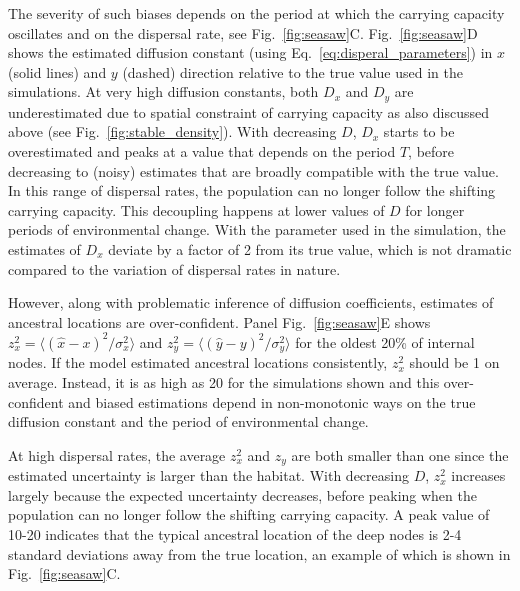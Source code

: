 \documentclass[aps,rmp, twocolumn]{revtex4}
\begin{document}
The severity of such biases depends on the period at which the carrying capacity oscillates and on the dispersal rate, see  Fig.~\ref{fig:seasaw}C.
Fig.~\ref{fig:seasaw}D shows the estimated diffusion constant (using Eq.~\ref{eq:disperal_parameters}) in $x$ (solid lines) and $y$ (dashed) direction relative to the true value used in the simulations.
At very high diffusion constants, both $D_x$ and $D_y$ are underestimated due to spatial constraint of carrying capacity as also discussed above (see Fig.~\ref{fig:stable_density}).
With decreasing $D$, $D_x$ starts to be overestimated and peaks at a value that depends on the period $T$, before decreasing to (noisy) estimates that are broadly compatible with the true value.
In this range of dispersal rates, the population can no longer follow the shifting carrying capacity.
This decoupling happens at lower values of $D$ for longer periods of environmental change.
With the parameter used in the simulation, the estimates of $D_x$ deviate by a factor of 2 from its true value, which is not dramatic compared to the variation of dispersal rates in nature.

However, along with problematic inference of diffusion coefficients, estimates of ancestral locations are over-confident.
Panel Fig.~\ref{fig:seasaw}E shows $z_x^2 = \langle (\hat{x} - x)^2/\sigma_x^2 \rangle$ and $z_y^2=\langle (\hat{y} - y)^2/\sigma_y^2\rangle$ for the oldest 20\% of internal nodes.
If the model estimated ancestral locations consistently, $z_x^2$ should be 1 on average.
Instead, it is as high as 20 for the simulations shown and this over-confident and biased estimations depend in non-monotonic ways on the true diffusion constant and the period of environmental change.

At high dispersal rates, the average $z_x^2$ and $z_y$ are both smaller than one since the estimated uncertainty is larger than the habitat.
With decreasing $D$, $z_x^2$ increases largely because the expected uncertainty decreases, before peaking when the population can no longer follow the shifting carrying capacity.
A peak value of 10-20 indicates that the typical ancestral location of the deep nodes is 2-4 standard deviations away from the true location, an example of which is shown in Fig.~\ref{fig:seasaw}C.
\end{document}
